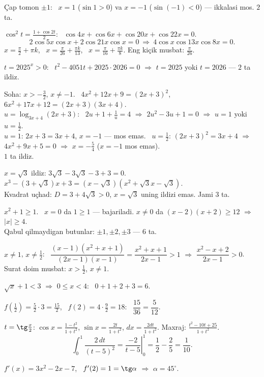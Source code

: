 Çap tomon $\pm1$: \ $x=1$ ($\sin1>0$) va $x=-1$ ($\sin(-1)<0$) — ikkalasi mos. $2$ ta.

$\cos^2t=\frac{1+\cos2t}2$: \ $\cos4x+\cos6x+\cos20x+\cos22x=0$.
\[2\cos5x\cos x+2\cos21x\cos x=0\ \Rightarrow\ 4\cos x\cos13x\cos8x=0.\]
$x=\frac\pi2+\pi k$, \ $x=\frac\pi{26}+\frac{\pi k}{13}$, \ $x=\frac\pi{16}+\frac{\pi k}8$. Eng kiçik musbat: $\frac\pi{26}$.

$t=2025^x>0$: \ $t^2-4051t+2025\cdot2026=0$ $\Rightarrow$ $t=2025$ yoki $t=2026$ — $2$ ta ildiz.

Soha: $x>-\frac32$, $x\ne-1$. \ $4x^2+12x+9=(2x+3)^2$, \ $6x^2+17x+12=(2x+3)(3x+4)$.\\
$u=\log_{3x+4}(2x+3)$: \ $2u+1+\frac1u=4$ $\Rightarrow$ $2u^2-3u+1=0$ $\Rightarrow$ $u=1$ yoki $u=\frac12$.\\
$u=1$: $2x+3=3x+4$, $x=-1$ — mos emas. \ $u=\frac12$: $(2x+3)^2=3x+4$ $\Rightarrow$ $4x^2+9x+5=0$ $\Rightarrow$ $x=-\frac54$ ($x=-1$ mos emas).\\
$1$ ta ildiz.

$x=\sqrt3$ ildiz: $3\sqrt3-3\sqrt3-3+3=0$. \ $x^3-(3+\sqrt3)x+3=\left(x-\sqrt3\right)\left(x^2+\sqrt3x-\sqrt3\right)$.\\
Kvadrat uçhad: $D=3+4\sqrt3>0$, $x=\sqrt3$ uning ildizi emas. Jami $3$ ta.

$x^2+1\ge1$. \ $x=0$ da $1\ge1$ — bajariladi. $x\ne0$ da $(x-2)(x+2)\ge12$ $\Rightarrow$ $|x|\ge4$.\\
Qabul qilmaydigan butunlar: $\pm1,\pm2,\pm3$ — $6$ ta.

$x\ne1$, $x\ne\frac12$: \ $\dfrac{(x-1)(x^2+x+1)}{(2x-1)(x-1)}=\dfrac{x^2+x+1}{2x-1}>1$ $\Rightarrow$ $\dfrac{x^2-x+2}{2x-1}>0$.\\
Surat doim musbat: $x>\frac12$, $x\ne1$.

$\sqrt x+1<3$ $\Rightarrow$ $0\le x<4$: \ $0+1+2+3=6$.

$f\left(\frac12\right)=\frac52\cdot3=\frac{15}2$, \ $f(2)=4\cdot\frac92=18$: \ $\dfrac{15}{36}=\dfrac5{12}$.

$t=\tg\frac x2$: $\cos x=\frac{1-t^2}{1+t^2}$, $\sin x=\frac{2t}{1+t^2}$, $dx=\frac{2dt}{1+t^2}$. Maxraj: $\frac{t^2-10t+25}{1+t^2}$.
\[\int_0^1\frac{2\,dt}{(t-5)^2}=\left.\frac{-2}{t-5}\right|_0^1=\frac12-\frac25=\frac1{10}.\]

$f'(x)=3x^2-2x-7$, \ $f'(2)=1=\tg\alpha$ $\Rightarrow$ $\alpha=45^\circ$.

